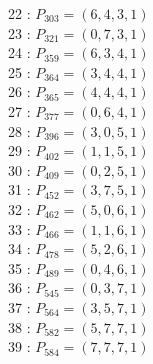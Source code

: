 \documentclass{article}
\begin{document}
{\begin{multicols}{2}
22 : $P_{303}=( 6, 4, 3, 1 )$\\
23 : $P_{321}=( 0, 7, 3, 1 )$\\
24 : $P_{359}=( 6, 3, 4, 1 )$\\
25 : $P_{364}=( 3, 4, 4, 1 )$\\
26 : $P_{365}=( 4, 4, 4, 1 )$\\
27 : $P_{377}=( 0, 6, 4, 1 )$\\
28 : $P_{396}=( 3, 0, 5, 1 )$\\
29 : $P_{402}=( 1, 1, 5, 1 )$\\
30 : $P_{409}=( 0, 2, 5, 1 )$\\
31 : $P_{452}=( 3, 7, 5, 1 )$\\
32 : $P_{462}=( 5, 0, 6, 1 )$\\
33 : $P_{466}=( 1, 1, 6, 1 )$\\
34 : $P_{478}=( 5, 2, 6, 1 )$\\
35 : $P_{489}=( 0, 4, 6, 1 )$\\
36 : $P_{545}=( 0, 3, 7, 1 )$\\
37 : $P_{564}=( 3, 5, 7, 1 )$\\
38 : $P_{582}=( 5, 7, 7, 1 )$\\
39 : $P_{584}=( 7, 7, 7, 1 )$\\
\end{multicols}
}
\end{document}
